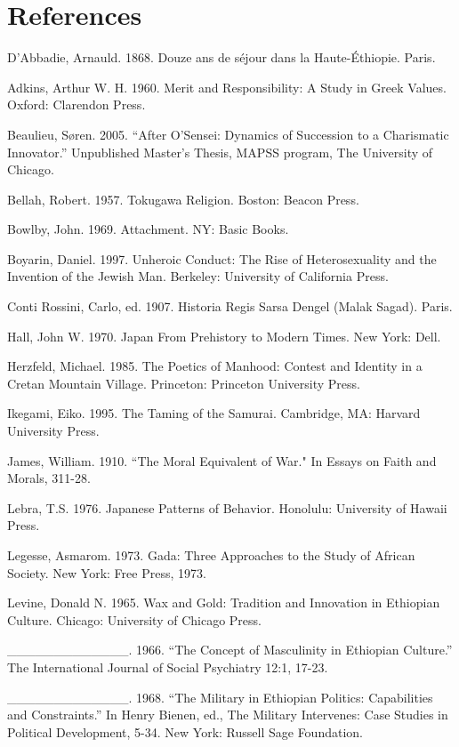 \section*{References}

\begin{list}{}{}
\item D'Abbadie, Arnauld. 1868. Douze ans de s\'{e}jour dans la Haute-\'{E}thiopie. Paris.
\item Adkins, Arthur W. H. 1960. Merit and Responsibility: A Study in Greek Values. Oxford: Clarendon Press.
\item Beaulieu, S\o{}ren. 2005. ``After O'Sensei: Dynamics of Succession to a Charismatic Innovator.'' Unpublished Master's Thesis, MAPSS program, The University of Chicago. 
\item Bellah, Robert. 1957. Tokugawa Religion. Boston: Beacon Press.
\item Bowlby, John. 1969. Attachment. NY: Basic Books.
\item Boyarin, Daniel. 1997. Unheroic Conduct: The Rise of Heterosexuality and the Invention of the Jewish Man. Berkeley: University of California Press.
\item Conti Rossini, Carlo, ed. 1907. Historia Regis Sarsa Dengel (Malak Sagad). Paris.
\item Hall, John W. 1970. Japan From Prehistory to Modern Times. New York: Dell.
\item Herzfeld, Michael. 1985. The Poetics of Manhood: Contest and Identity in a Cretan Mountain Village. Princeton: Princeton University Press.
\item Ikegami, Eiko. 1995. The Taming of the Samurai. Cambridge, MA: Harvard University Press. 
\item James, William. 1910. ``The Moral Equivalent of War." In Essays on Faith and Morals, 311-28.
\item Lebra, T.S. 1976. Japanese Patterns of Behavior. Honolulu: University of Hawaii Press.
\item Legesse, Asmarom. 1973. Gada: Three Approaches to the Study of African Society. New York: Free Press, 1973.
\item Levine, Donald N. 1965. Wax and Gold: Tradition and Innovation in Ethiopian Culture. Chicago: University of Chicago Press.
\item \_\_\_\_\_\_\_\_\_\_\_\_\_. 1966. ``The Concept of Masculinity in Ethiopian Culture.'' The International Journal of Social Psychiatry 12:1, 17-23.
\item \_\_\_\_\_\_\_\_\_\_\_\_\_. 1968. ``The Military in Ethiopian Politics: Capabilities and Constraints.'' In Henry Bienen, ed., The Military Intervenes: Case Studies in Political Development, 5-34. New York: Russell Sage Foundation.

\end{list}
